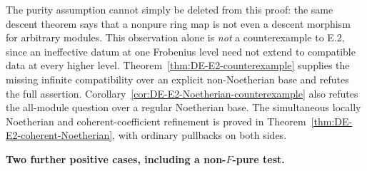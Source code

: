 The purity assumption cannot simply be deleted from this proof: the same descent theorem says that a nonpure ring map is not even a descent morphism for arbitrary modules.  This observation alone is \emph{not} a counterexample to E.2, since an ineffective datum at one Frobenius level need not extend to compatible data at every higher level.  Theorem~\ref{thm:DE-E2-counterexample} supplies the missing infinite compatibility over an explicit non-Noetherian base and refutes the full assertion.  Corollary~\ref{cor:DE-E2-Noetherian-counterexample} also refutes the all-module question over a regular Noetherian base.  The simultaneous locally Noetherian and coherent-coefficient refinement is proved in Theorem~\ref{thm:DE-E2-coherent-Noetherian}, with ordinary pullbacks on both sides.


\par\smallskip\noindent\textbf{Two further positive cases, including a non-$F$-pure test.}

